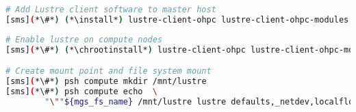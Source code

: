 
\begin{lstlisting}[language=bash,keywords={},upquote=true]
# Add Lustre client software to master host
[sms](*\#*) (*\install*) lustre-client-ohpc lustre-client-ohpc-modules
\end{lstlisting}

\begin{lstlisting}[language=bash,keywords={},upquote=true]
# Enable lustre on compute nodes
[sms](*\#*) (*\chrootinstall*) lustre-client-ohpc lustre-client-ohpc-modules

# Create mount point and file system mount
[sms](*\#*) psh compute mkdir /mnt/lustre
[sms](*\#*) psh compute echo  \ 
        "\""${mgs_fs_name} /mnt/lustre lustre defaults,_netdev,localflock,retry=2 0 0"\"" \>\> /etc/fstab
\end{lstlisting}
